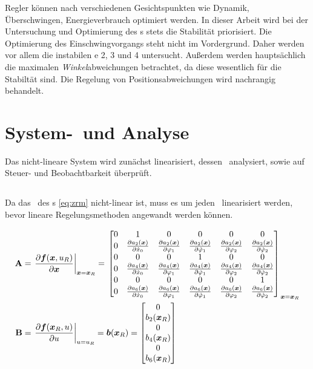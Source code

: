 Regler können nach verschiedenen Gesichtspunkten wie Dynamik, Überschwingen, Energieverbrauch optimiert werden.
In dieser Arbeit wird bei der Untersuchung und Optimierung des \dpd s stets die Stabilität priorisiert.
Die Optimierung des Einschwingvorgangs steht nicht im Vordergrund.
Daher werden vor allem die instabilen \ap e 2, 3 und 4 untersucht.
Außerdem werden hauptsächlich die maximalen \emph{Winkel}abweichungen betrachtet, da diese wesentlich für die Stabiltät sind.
Die Regelung von Positionsabweichungen wird nachrangig behandelt.


\section{System-\lin\ und Analyse}%

Das nicht-lineare System wird zunächst linearisiert, dessen \ewe\ analysiert, sowie auf Steuer- und Beobachtbarkeit überprüft.

\subsection{\lin}\label{subsec:lin}

Da das \zrm\ des \spds s \eqref{eq:zrm} nicht-linear ist, muss es um jeden \ap\ linearisiert werden, bevor lineare Regelungsmethoden angewandt werden können. 

\begin{align}
	{\ensuremath{\boldsymbol{\mathrm{A}}}} &= \left. \frac{\partial \boldsymbol{f}(\boldsymbol{x},u_R)}{\partial \boldsymbol{x}} \right|_{\boldsymbol{x}=\boldsymbol{x}_R}  
		= \left. \begin{bmatrix}
		0 & 1 & 0 & 0 & 0 & 0 \\
		0 & \frac{\partial a_2(\boldsymbol{x})}{\partial \dot{x}_0} & \frac{\partial a_2(\boldsymbol{x})}{\partial \varphi_1} & \frac{\partial a_2(\boldsymbol{x})}{\partial \dot{\varphi}_1} & \frac{\partial a_2(\boldsymbol{x})}{\partial \varphi_2} & \frac{\partial a_2(\boldsymbol{x})}{\partial \dot{\varphi}_2} \\
		0 & 0 & 0 & 1 & 0 & 0 \\
		0 & \frac{\partial a_4(\boldsymbol{x})}{\partial \dot{x}_0} & \frac{\partial a_4(\boldsymbol{x})}{\partial \varphi_1} & \frac{\partial a_4(\boldsymbol{x})}{\partial \dot{\varphi}_1} & \frac{\partial a_4(\boldsymbol{x})}{\partial \varphi_2} & \frac{\partial a_4(\boldsymbol{x})}{\partial \dot{\varphi}_2} \\
		0 & 0 & 0 & 0 & 0 & 1 \\
		0 & \frac{\partial a_6(\boldsymbol{x})}{\partial \dot{x}_0} & \frac{\partial a_6(\boldsymbol{x})}{\partial \varphi_1} & \frac{\partial a_6(\boldsymbol{x})}{\partial \dot{\varphi}_1} & \frac{\partial a_6(\boldsymbol{x})}{\partial \varphi_2} & \frac{\partial a_6(\boldsymbol{x})}{\partial \dot{\varphi}_2} \\
	\end{bmatrix} \right._{\boldsymbol{x}=\boldsymbol{x}_R}  \\
	{\boldsymbol{\mathrm{B}}} &= \left. \frac{\partial \boldsymbol{f}(\boldsymbol{x}_R,u)}{\partial u} \right|_{u=u_R}
	= \boldsymbol{b}(\boldsymbol{x}_R) = \begin{bmatrix}
		0 \\ b_2(\boldsymbol{x}_R) \\ 0 \\  b_4(\boldsymbol{x}_R) \\ 0 \\  b_6(\boldsymbol{x}_R)
	\end{bmatrix}
\end{align}

